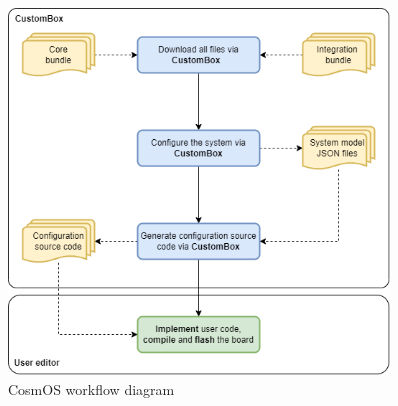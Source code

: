 \begin{figure}[H]
\begin{center}
\includegraphics[width=0.9\textwidth]{images/workflow.png}
\caption{CosmOS workflow diagram}
\label{fig:workflow}
\end{center}
\end{figure}

